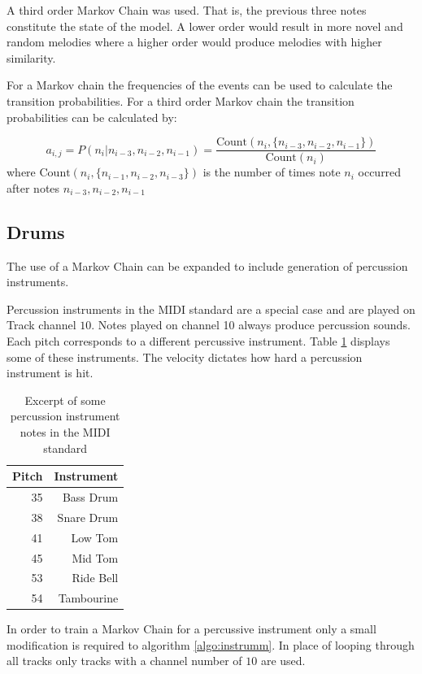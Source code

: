 A third order Markov Chain was used. That is, the previous three notes constitute the state of the model. A lower order would result in more novel and random melodies where a higher order would produce melodies with higher similarity. 

For a Markov chain the frequencies of the events can be used to calculate the transition probabilities. For a third order Markov chain the transition probabilities can be calculated by:

\[ a_{i,j} = P(n_i|n_{i-3},n_{i-2},n_{i-1}) = \frac{\text{Count}(n_i, \{ n_{i-3},n_{i-2},n_{i-1} \} )}{\text{Count}(n_i)} \]
where $\text{Count}(n_i, \{ n_{i-1},n_{i-2},n_{i-3} \} )$ is the number of times note $n_i$ occurred after notes $n_{i-3}, n_{i-2}, n_{i-1}$


\subsection{Drums}
The use of a Markov Chain can be expanded to include generation of percussion instruments. 

Percussion instruments in the MIDI standard are a special case and are played on Track channel $10$. Notes played on channel 10 always produce percussion sounds. Each pitch corresponds to a different percussive instrument. Table \ref{tab:percuspitchesexcerpt} displays some of these instruments. The velocity dictates how hard a percussion instrument is hit.

\begin{table}[htbp]
  \centering
  \caption{Excerpt of some percussion instrument notes in the \ac{MIDI} standard}
    \begin{tabular}{r|r}
    \toprule
    Pitch & Instrument\\
    \midrule
    35    & Bass Drum \\
    38    & Snare Drum \\
    41    & Low Tom \\
    45    & Mid Tom \\
    53    & Ride Bell \\
    54    & Tambourine \\
    \bottomrule
    \end{tabular}%
  \label{tab:percuspitchesexcerpt}%
\end{table}%

In order to train a Markov Chain for a percussive instrument only a small modification is required to algorithm \ref{algo:instrumm}. In place of looping through all tracks only tracks with a channel number of $10$ are used.

